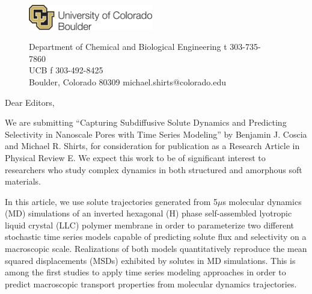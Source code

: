 \documentclass[fontsize=11pt]{article}
\begin{document}
	\graphicspath{{./figures/}}

	\begin{figure}
	\centering
	\begin{minipage}{0.37\textwidth}
	\includegraphics[width=2.14in,left]{CUBoulder.pdf}
	\end{minipage}
	\begin{minipage}{0.62\textwidth}
	\scriptsize
	\noindent Department of Chemical and Biological Engineering \hfill t 303-735-7860~~~~~~~~~~~~~~~~~~ \\
	 UCB \hfill f 303-492-8425~~~~~~~~~~~~~~~~~~ \\
	\noindent Boulder, Colorado 80309 \hfill michael.shirts@colorado.edu \\
	\end{minipage}
	\end{figure}
	
	\noindent \date

	\noindent Dear Editors,\\
	
	\newcommand{\ManuscriptTitle}{Capturing Subdiffusive Solute Dynamics and 
	Predicting Selectivity in Nanoscale Pores with Time Series Modeling}
	
	We are submitting ``\ManuscriptTitle'' by Benjamin J. Coscia and Michael R.
	Shirts, for consideration for publication as a Research Article in Physical 
	Review E. We expect this work to be of significant interest to researchers 
	who study complex dynamics in both structured and amorphous soft materials.
	
	In this article, we use solute trajectories generated from 5$\mu$s molecular
	dynamics (MD) simulations of an inverted hexagonal (H) phase
	self-assembled lyotropic liquid crystal (LLC) polymer membrane in order to 
	parameterize two different stochastic time series models capable of predicting
	solute flux and selectivity on a macroscopic scale. Realizations of both models
	quantitatively reproduce the mean squared displacements (MSDs) exhibited by 
	solutes in MD simulations. This is among the first studies to apply time 
	series modeling approaches in order to predict 
        macroscopic transport properties from molecular dynamics trajectories.
\end{document}
